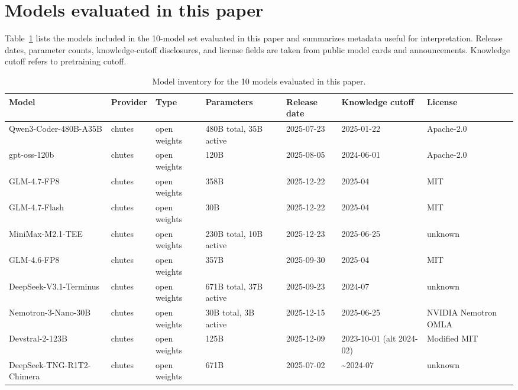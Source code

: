 \section{Models evaluated in this paper}
\label{sec:appendix-models}

Table~\ref{tab:model-inventory} lists the models included in the 10-model set evaluated in this paper and summarizes metadata useful for interpretation. Release dates, parameter counts, knowledge-cutoff disclosures, and license fields are taken from public model cards and announcements. Knowledge cutoff refers to pretraining cutoff.

\begin{table}[H]
\centering
\scriptsize
\setlength{\tabcolsep}{3pt}
\begin{tabular}{p{3.7cm}p{1.2cm}p{1.3cm}p{1.55cm}p{1.3cm}p{1.9cm}p{1.45cm}}
\toprule
Model & Provider & Type & Parameters & Release date & Knowledge cutoff & License \\
\midrule
Qwen3-Coder-480B-A35B & chutes & open weights & 480B total, 35B active & 2025-07-23 & 2025-01-22 & Apache-2.0 \\
gpt-oss-120b & chutes & open weights & 120B & 2025-08-05 & 2024-06-01 & Apache-2.0 \\
GLM-4.7-FP8 & chutes & open weights & 358B & 2025-12-22 & 2025-04 & MIT \\
GLM-4.7-Flash & chutes & open weights & 30B & 2025-12-22 & 2025-04 & MIT \\
MiniMax-M2.1-TEE & chutes & open weights & 230B total, 10B active & 2025-12-23 & 2025-06-25 & unknown \\
GLM-4.6-FP8 & chutes & open weights & 357B & 2025-09-30 & 2025-04 & MIT \\
DeepSeek-V3.1-Terminus & chutes & open weights & 671B total, 37B active & 2025-09-23 & 2024-07 & unknown \\
Nemotron-3-Nano-30B & chutes & open weights & 30B total, 3B active & 2025-12-15 & 2025-06-25 & NVIDIA Nemotron OMLA \\
Devstral-2-123B & chutes & open weights & 125B & 2025-12-09 & 2023-10-01 (alt 2024-02) & Modified MIT \\
DeepSeek-TNG-R1T2-Chimera & chutes & open weights & 671B & 2025-07-02 & \textasciitilde{}2024-07 & unknown \\
\bottomrule
\end{tabular}
\caption{Model inventory for the 10 models evaluated in this paper.}
\label{tab:model-inventory}
\end{table}
